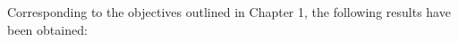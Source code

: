 

Corresponding to the objectives outlined in Chapter 1,
  the following results have been obtained:
